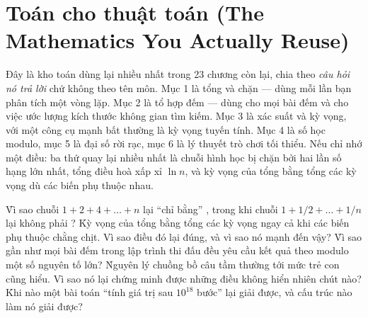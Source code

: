 \documentclass[../../algorithm.tex]{subfiles}
\begin{document}
\chapter{Toán cho thuật toán (The Mathematics You Actually Reuse)}

\begin{tomtat}
Đây là kho toán dùng lại nhiều nhất trong 23 chương còn lại, chia theo \emph{câu hỏi nó trả lời} chứ không theo tên môn. Mục 1 là tổng và chặn --- dùng mỗi lần bạn phân tích một vòng lặp. Mục 2 là tổ hợp đếm --- dùng cho mọi bài đếm và cho việc ước lượng kích thước không gian tìm kiếm. Mục 3 là xác suất và kỳ vọng, với một công cụ mạnh bất thường là kỳ vọng tuyến tính. Mục 4 là số học modulo, mục 5 là đại số rời rạc, mục 6 là lý thuyết trò chơi tối thiểu. Nếu chỉ nhớ một điều: ba thứ quay lại nhiều nhất là chuỗi hình học bị chặn bởi hai lần số hạng lớn nhất, tổng điều hoà xấp xỉ \(\ln n\), và kỳ vọng của tổng bằng tổng các kỳ vọng dù các biến phụ thuộc nhau.
\end{tomtat}

\begin{nentang}
\end{nentang}

\begin{khoigoi}
\h{Vì sao chuỗi \(1+2+4+\dots+n\) lại ``chỉ bằng'' , trong khi chuỗi \(1+1/2+\dots+1/n\) lại không phải ?}
\h{Kỳ vọng của tổng bằng tổng các kỳ vọng ngay cả khi các biến phụ thuộc chằng chịt. Vì sao điều đó lại đúng, và vì sao nó mạnh đến vậy?}
\h{Vì sao gần như mọi bài đếm trong lập trình thi đấu đều yêu cầu kết quả theo modulo một số nguyên tố lớn?}
\h{Nguyên lý chuồng bồ câu tầm thường tới mức trẻ con cũng hiểu. Vì sao nó lại chứng minh được những điều không hiển nhiên chút nào?}
\h{Khi nào một bài toán ``tính giá trị sau \(10^{18}\) bước'' lại giải được, và cấu trúc nào làm nó giải được?}
\end{khoigoi}
\end{document}
